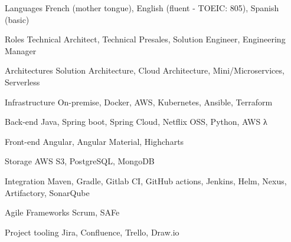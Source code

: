 

\begin{cvskills}

  \cvskill
    {Languages}
    {French (mother tongue), English (fluent - TOEIC: 805), Spanish (basic)}
  
  \cvskill
    {Roles}
    {Technical Architect, Technical Presales, Solution Engineer, Engineering Manager}

  \cvskill
    {Architectures}
    {Solution Architecture, Cloud Architecture, Mini/Microservices, Serverless}

  \cvskill
    {Infrastructure}
    {On-premise, Docker, AWS, Kubernetes, Ansible, Terraform}

  \cvskill
    {Back-end}
    {Java, Spring boot, Spring Cloud, Netflix OSS, Python, AWS λ}

  \cvskill
    {Front-end}
    {Angular, Angular Material, Highcharts}

  \cvskill
    {Storage}
    {AWS S3, PostgreSQL, MongoDB}

  \cvskill
    {Integration}
    {Maven, Gradle, Gitlab CI, GitHub actions, Jenkins, Helm, Nexus, Artifactory,
    SonarQube}

  \cvskill
    {Agile Frameworks}
    {Scrum, SAFe}

  \cvskill
    {Project tooling}
    {Jira, Confluence, Trello, Draw.io}

\end{cvskills}
